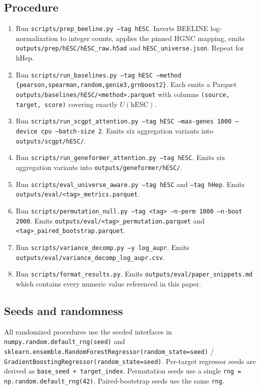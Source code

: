 \subsection{Procedure}

\begin{enumerate}
\item Run \texttt{scripts/prep\_beeline.py --tag hESC}. Inverts BEELINE
log-normalization to integer counts, applies the pinned HGNC mapping,
emits \texttt{outputs/prep/hESC/hESC\_raw.h5ad} and
\texttt{hESC\_universe.json}. Repeat for hHep.
\item Run \texttt{scripts/run\_baselines.py --tag hESC --method
\{pearson,spearman,random,genie3,grnboost2\}}. Each emits a Parquet
\texttt{outputs/baselines/hESC/<method>.parquet} with columns
\texttt{(source, target, score)} covering exactly $U(\text{hESC})$.
\item Run \texttt{scripts/run\_scgpt\_attention.py --tag hESC
--max-genes 1000 --device cpu --batch-size 2}. Emits six aggregation
variants into \texttt{outputs/scgpt/hESC/}.
\item Run \texttt{scripts/run\_geneformer\_attention.py --tag hESC}.
Emits six aggregation variants into \texttt{outputs/geneformer/hESC/}.
\item Run \texttt{scripts/eval\_universe\_aware.py --tag hESC} and
\texttt{--tag hHep}. Emits
\texttt{outputs/eval/<tag>\_metrics.parquet}.
\item Run \texttt{scripts/permutation\_null.py --tag <tag>
--n-perm 1000 --n-boot 2000}. Emits
\texttt{outputs/eval/<tag>\_permutation.parquet} and
\texttt{<tag>\_paired\_bootstrap.parquet}.
\item Run \texttt{scripts/variance\_decomp.py --y log\_aupr}. Emits
\texttt{outputs/eval/variance\_decomp\_log\_aupr.csv}.
\item Run \texttt{scripts/format\_results.py}. Emits
\texttt{outputs/eval/paper\_snippets.md} which contains every numeric
value referenced in this paper.
\end{enumerate}

\subsection{Seeds and randomness}

All randomized procedures use the seeded interfaces in
\texttt{numpy.random.default\_rng(seed)} and
\texttt{sklearn.ensemble.RandomForestRegressor(random\_state=seed)} /
\texttt{GradientBoostingRegressor(random\_state=seed)}. Per-target
regressor seeds are derived as \texttt{base\_seed + target\_index}.
Permutation seeds use a single \texttt{rng = np.random.default\_rng(42)}.
Paired-bootstrap seeds use the same \texttt{rng}.

